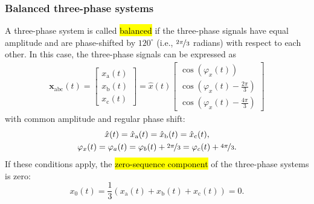 \begin{frame}
    \frametitle{Balanced three-phase systems}
    A three-phase system is called \hl{balanced} if the three-phase signals have equal amplitude and are phase-shifted by $120^\circ$ (i.e., $\nicefrac{2\pi}{3}$ radians) with respect to each other. \pause In this case, the three-phase signals can be expressed as
    \begin{equation}
        \begin{split}
            \bm{x}_{\mathrm{abc}}(t) = \begin{bmatrix}
                                           x_\mathrm{a}(t) \\
                                           x_\mathrm{b}(t) \\
                                           x_\mathrm{c}(t)
                                       \end{bmatrix} = \hat{x}(t) \begin{bmatrix}
                                                                      \cos(\varphi_x(t))                             \\
                                                                      \cos\left(\varphi_x(t) - \frac{2\pi}{3}\right) \\
                                                                      \cos\left(\varphi_x(t) - \frac{4\pi}{3}\right)
                                                                  \end{bmatrix}
        \end{split}
    \end{equation}
    with common amplitude and regular phase shift:
    \begin{equation}
        \begin{gathered}
            \hat{x}(t)    =\hat{x}_\mathrm{a}(t)=\hat{x}_\mathrm{b}(t)=\hat{x}_\mathrm{c}(t),            \\
            \varphi_x(t)  =\varphi_a(t)=\varphi_b(t)+\nicefrac{2\pi}{3}=\varphi_c(t)+\nicefrac{4\pi}{3}.
        \end{gathered}
    \end{equation}\pause
    If these conditions apply, the \hl{zero-sequence component} of the three-phase systems is zero:
    \begin{equation}
        x_0(t) = \frac{1}{3}\left(x_\mathrm{a}(t)+x_\mathrm{b}(t)+x_\mathrm{c}(t)\right) = 0.
    \end{equation}
\end{frame}

